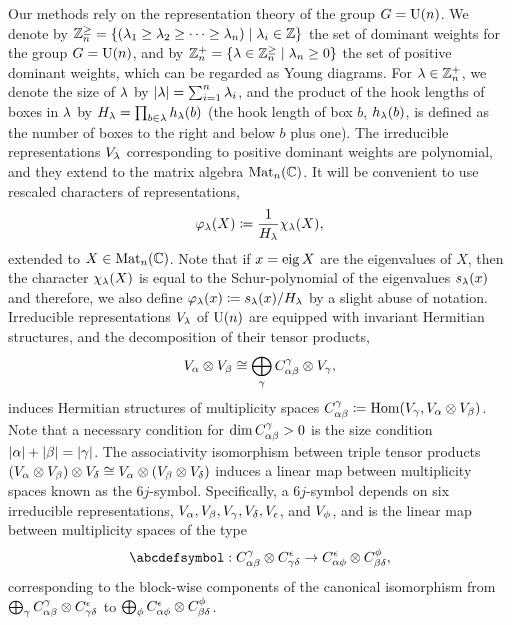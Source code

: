 \documentclass[notitlepage, 11pt, letterpaper]{amsart}
\begin{document}
Our methods rely on the representation theory of the group $G = \operatorname{U}(n)$.
We denote by $\mathbb Z^{\geq}_{n} = \{ (\lambda_1 \geq \lambda_2 \geq \cdots \geq \lambda_n) \mid \lambda_i \in \mathbb{Z} \}$ the set of dominant weights for the group $G=\operatorname{U}(n)$, and
by $\mathbb Z^{+}_{n} = \{ \lambda \in \mathbb Z^{\geq}_{n} \mid \lambda_n \geq 0\}$ the set of positive dominant weights, which can be regarded as Young diagrams.
For $\lambda \in \mathbb Z^{+}_{n}$, we denote the size of $\lambda$ by $|\lambda| = \sum_{i=1}^n \lambda_i$, and the product of the hook lengths of boxes in $\lambda$ by $H_{\lambda} = \prod_{b\in \lambda} h_{\lambda}(b)$ (the hook length of box $b$, $h_{\lambda}(b)$, is defined as the number of boxes to the right and below $b$ plus one).
The irreducible representations $V_{\lambda}$ corresponding to positive dominant weights are polynomial, and they extend to the matrix algebra $\operatorname{Mat}_n(\mathbb{C})$.
It will be convenient to use rescaled characters of representations,
\begin{equation}
    \varphi_\lambda(X) \coloneq \frac{1}{H_\lambda} \chi_\lambda(X),
\end{equation}
extended to $X \in \operatorname{Mat}_n(\mathbb{C})$.
Note that if $x = \operatorname{eig} X$ are the eigenvalues of $X$, then the character $\chi_\lambda(X)$ is equal to the Schur-polynomial of the eigenvalues $s_{\lambda}(x)$ and therefore, we also define $\varphi_{\lambda}(x) \coloneqq s_{\lambda}(x)/H_\lambda$ by a slight abuse of notation.
Irreducible representations $V_\lambda$ of $\operatorname{U}(n)$ are equipped with invariant Hermitian structures, and the decomposition of their tensor products,
\begin{equation}
    V_\alpha \otimes V_\beta \cong \bigoplus_\gamma C_{\alpha \beta}^\gamma \otimes V_\gamma,
\end{equation}
induces Hermitian structures of multiplicity spaces $C_{\alpha \beta}^\gamma \coloneqq \operatorname{Hom}(V_{\gamma}, V_{\alpha}\otimes V_{\beta})$.
Note that a necessary condition for $\dim C_{\alpha \beta}^\gamma > 0$ is the size condition $|\alpha| + |\beta| = |\gamma|$.
The associativity isomorphism between triple tensor products $(V_\alpha \otimes V_\beta) \otimes V_\delta \cong V_\alpha \otimes (V_\beta \otimes V_\delta)$ induces a linear map between multiplicity spaces known as the $6j$-symbol.
Specifically, a $6j$-symbol depends on six irreducible representations, $V_{\alpha}, V_{\beta}, V_{\gamma}, V_{\delta}, V_{\epsilon}$, and $V_{\phi}$, and is the linear map between multiplicity spaces of the type
\begin{equation*}
    \abcdefsymbol :
    C^{\yc}_{\ya\yb} \ot C^{\ye}_{\yc\yd} \to C^{\ye}_{\ya\yf} \ot C^{\yf}_{\yb\yd},
\end{equation*}
corresponding to the block-wise components of the canonical isomorphism from $\bigoplus_{\gamma} C^{\gamma}_{\alpha\beta} \otimes C^{\epsilon}_{\gamma\delta}$ to $\bigoplus_{\phi} C^{\epsilon}_{\alpha\phi} \otimes C^{\phi}_{\beta\delta}$.
\end{document}
